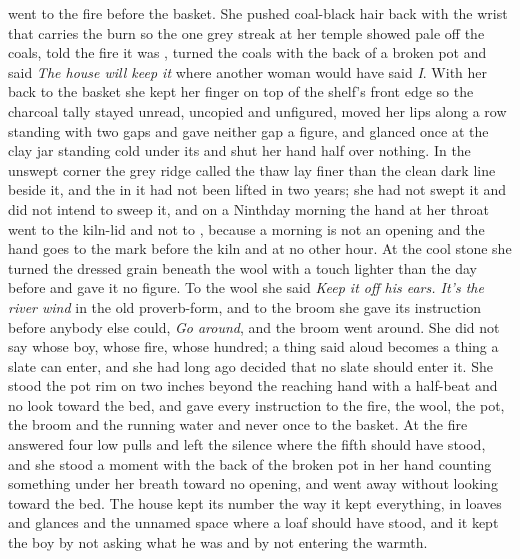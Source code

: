  went to the fire before the basket. She pushed coal-black hair back with the wrist that carries the burn so the one grey streak at her temple showed pale off the coals, told the fire it was , turned the coals with the back of a broken pot and said \emph{The house will keep it} where another woman would have said \emph{I}. With her back to the basket she kept her finger on top of the shelf's front edge so the charcoal tally stayed unread, uncopied and unfigured, moved her lips along a row standing with two gaps and gave neither gap a figure, and glanced once at the clay jar standing cold under its  and shut her hand half over nothing. In the unswept corner the grey ridge called the thaw lay finer than the clean dark line beside it, and the  in it had not been lifted in two years; she had not swept it and did not intend to sweep it, and on a Ninthday morning the hand at her throat went to the kiln-lid and not to , because a morning is not an opening and the hand goes to the mark before the kiln and at no other hour. At the cool stone she turned the dressed grain beneath the wool with a touch lighter than the day before and gave it no figure. To the wool she said \emph{Keep it off his ears. It's the river wind} in the old proverb-form, and to the broom she gave its instruction before anybody else could, \emph{Go around}, and the broom went around. She did not say whose boy, whose fire, whose hundred; a thing said aloud becomes a thing a slate can enter, and she had long ago decided that no slate should enter it. She stood the pot rim on  two inches beyond the reaching hand with a half-beat and no look toward the bed, and gave every instruction to the fire, the wool, the pot, the broom and the running water and never once to the basket. At  the fire answered four low pulls and left the silence where the fifth should have stood, and she stood a moment with the back of the broken pot in her hand counting something under her breath toward no opening, and went away without looking toward the bed. The house kept its number the way it kept everything, in loaves and glances and the unnamed space where a loaf should have stood, and it kept the boy by not asking what he was and by not entering the warmth.

\scenebreak

